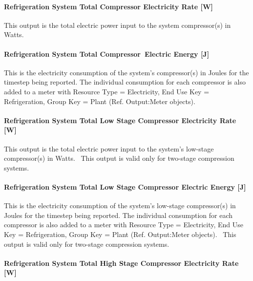 \paragraph{Refrigeration System Total Compressor Electricity Rate {[}W{]}}\label{refrigeration-system-total-compressor-electric-power-w}

This output is the total electric power input to the system compressor(s) in Watts.

\paragraph{Refrigeration System Total Compressor~Electric Energy {[}J{]}}\label{refrigeration-system-total-compressorelectric-energy-j}

This is the electricity consumption of the system's compressor(s) in Joules for the timestep being reported. The individual consumption for each compressor is also added to a meter with Resource Type = Electricity, End Use Key = Refrigeration, Group Key = Plant (Ref. Output:Meter objects).

\paragraph{Refrigeration System Total Low Stage Compressor Electricity Rate {[}W{]}}\label{refrigeration-system-total-low-stage-compressor-electric-power-w}

This output is the total electric power input to the system's low-stage compressor(s) in Watts.~ This output is valid only for two-stage compression systems.

\paragraph{Refrigeration System Total Low Stage Compressor Electric Energy {[}J{]}}\label{refrigeration-system-total-low-stage-compressor-electric-energy-j}

This is the electricity consumption of the system's low-stage compressor(s) in Joules for the timestep being reported. The individual consumption for each compressor is also added to a meter with Resource Type = Electricity, End Use Key = Refrigeration, Group Key = Plant (Ref. Output:Meter objects).~ This output is valid only for two-stage compression systems.

\paragraph{Refrigeration System Total High Stage Compressor Electricity Rate {[}W{]}}\label{refrigeration-system-total-high-stage-compressor-electric-power-w}

